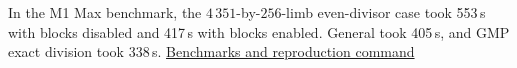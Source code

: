 \begin{perfnote}
In the M1 Max benchmark, the $4\,351$-by-$256$-limb even-divisor
case took 553\,\textmu s with blocks disabled and 417\,\textmu s
with blocks enabled. General \code{/} took 405\,\textmu s, and
GMP exact division took 338\,\textmu s.
\href{https://github.com/mmurshed/biginteger/blob/main/BENCHMARK.md\#blockwise-hensel-exact-division}{Benchmarks and reproduction command}
\end{perfnote}
